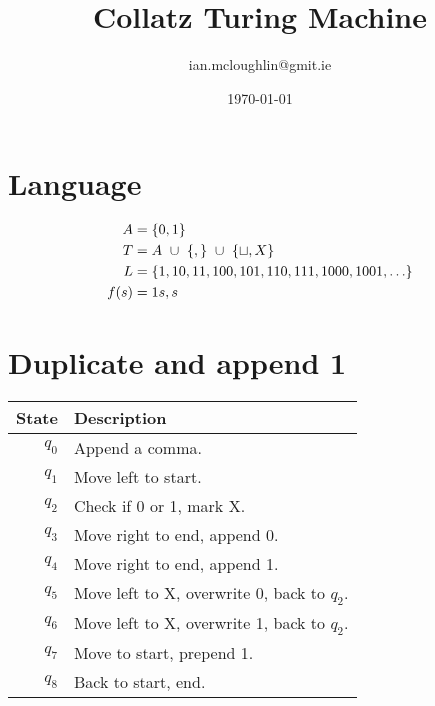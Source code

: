 \documentclass{notes}
\title{Collatz Turing Machine}
\author{ian.mcloughlin@gmit.ie}
\date{\today}
\begin{document}
  

  
\section*{Language}
  \begin{align*}
    A &= \{ 0, 1 \} \\
    T &= A \ \cup \ \{ , \} \ \cup \  \{ \sqcup,  X \} \\
    L &= \{1, 10, 11, 100, 101, 110, 111, 1000, 1001, \ldots \} \\
    f(s) &= 1s,s \\
  \end{align*}

\section*{Duplicate and append 1}
  \begin{tabular}{rl}
    \textbf{State} & \textbf{Description} \\
    \midrule
    \( q_0 \) & Append a comma. \\
    \( q_1 \) & Move left to start. \\
    \( q_2 \) & Check if 0 or 1, mark X. \\
    \( q_3 \) & Move right to end, append 0. \\
    \( q_4 \) & Move right to end, append 1. \\
    \( q_5 \) & Move left to X, overwrite 0, back to \(q_2\). \\
    \( q_6 \) & Move left to X, overwrite 1, back to \(q_2\). \\
    \( q_7 \) & Move to start, prepend 1. \\
    \( q_8 \) & Back to start, end. \\
  \end{tabular}
\end{document}
